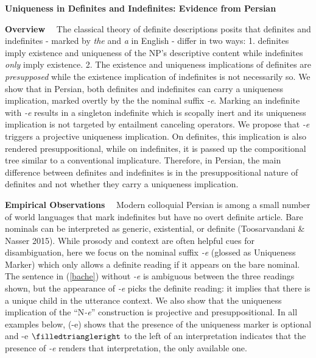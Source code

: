 \documentclass [11pt] {article}
\begin{document}
\begin {center}
{\large \textbf{Uniqueness in Definites and Indefinites: Evidence from Persian}}
\end {center}

\textbf{Overview} ~~The classical theory of definite descriptions posits that definites and indefinites - marked by \emph{the} and \emph{a} in English - differ in two ways: 1. definites imply existence and uniqueness of the NP's descriptive content while indefinites \textit{only} imply existence. 2. The existence and uniqueness implications of definites are \textit{presupposed} while the existence implication of indefinites is not necessarily so. We show that in Persian, both definites and indefinites can carry a uniqueness implication, marked overtly by the the nominal suffix \emph{-e}. Marking an indefinite with \emph{-e} results in a singleton indefinite which is scopally inert and its uniqueness implication is not targeted by entailment canceling operators. We propose that \emph{-e} triggers a projective uniqueness implication. On definites, this implication is also rendered presuppositional, while on indefinites, it is passed up the compositional tree similar to a conventional implicature. Therefore, in Persian, the main difference between definites and indefinites is in the presuppositional nature of definites and not whether they carry a uniqueness implication.

\textbf{Empirical Observations} ~~Modern colloquial Persian is among a small number of world languages that mark indefinites but have no overt definite article. Bare nominals can be interpreted as generic, existential, or definite (Toosarvandani \& Nasser 2015). While prosody and context are often helpful cues for disambiguation, here we focus on the nominal suffix \emph{-e} (glossed as Uniqueness Marker) which only allows a definite reading if it appears on the bare nominal. The sentence in (\ref{bache}) without \emph{-e} is ambiguous between the three readings shown, but the appearance of \emph{-e} picks the definite reading: it implies that there is a unique child in the utterance context. We also show that the uniqueness implication of the ``\textsc{N}\emph{-e}'' construction is projective and presuppositional. In all examples below, ({\color {blue}-e}) shows that the presence of the uniqueness marker is optional and {\color {blue}-e} $\filledtriangleright$ to the left of an interpretation indicates that the presence of \emph{-e} renders that interpretation, the only available one.
\end{document}
